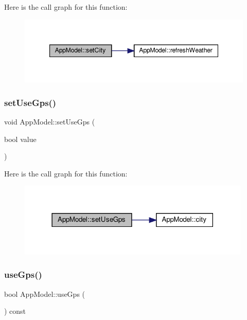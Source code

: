 Here is the call graph for this function\+:\nopagebreak
\begin{figure}[H]
\begin{center}
\leavevmode
\includegraphics[width=347pt]{class_app_model_ad0135d4a1551b6484ac28c434f861af5_cgraph}
\end{center}
\end{figure}
\mbox{\label{class_app_model_a81c3ffb3370837086366c9f70bb3d5eb}} 
\subsubsection{\texorpdfstring{set\+Use\+Gps()}{setUseGps()}}
{\footnotesize\ttfamily void App\+Model\+::set\+Use\+Gps (\begin{DoxyParamCaption}\item[{bool}]{value }\end{DoxyParamCaption})}

Here is the call graph for this function\+:\nopagebreak
\begin{figure}[H]
\begin{center}
\leavevmode
\includegraphics[width=314pt]{class_app_model_a81c3ffb3370837086366c9f70bb3d5eb_cgraph}
\end{center}
\end{figure}
\mbox{\label{class_app_model_a0e6e7506ba084133a6927d8c633ad699}} 
\subsubsection{\texorpdfstring{use\+Gps()}{useGps()}}
{\footnotesize\ttfamily bool App\+Model\+::use\+Gps (\begin{DoxyParamCaption}{ }\end{DoxyParamCaption}) const}

